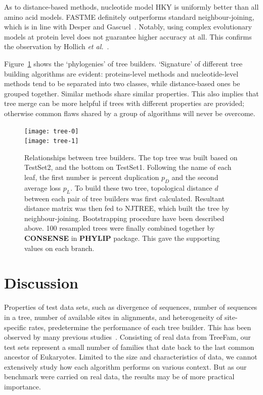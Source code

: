 As to distance-based methods, nucleotide model HKY is uniformly better than all amino acid models.
FASTME definitely outperforms standard neighbour-joining, which is in line with Desper and Gascuel~\cite{desper04}.
Notably, using complex evolutionary models at protein level does not guarantee higher accuracy at all.
This confirms the observation by Hollich {\it et al.}~\cite{hollich05}.

Figure~\ref{fig:phy-tree} shows the `phylogenies' of tree builders. `Signature' of different
tree building algorithms are evident: proteins-level methods and nucleotide-level methods
tend to be separated into two classes, while distance-based ones be grouped together.
Similar methods share similar properties. This also implies that tree merge can be more
helpful if trees with different properties are provided; otherwise common flaws
shared by a group of algorithms will never be overcome.

\begin{figure}[!hb]
\begin{center}
\texttt{[image: tree-0]}\\
\texttt{[image: tree-1]}
\caption[Relationships between tree builders]
{Relationships between tree builders. The top tree was built based on {\sf TestSet2}, and
the bottom on {\sf TestSet1}. Following the name of each leaf, the first number is percent duplication $p_D$
and the second average loss $p_L$. To build these two tree, topological distance $d$ between each pair of tree builders
was first calculated. Resultant distance matrix was then fed to NJTREE, which built the tree
by neighbour-joining. Bootstrapping procedure have been described above. 100 resampled
trees were finally combined together by {\bf CONSENSE} in {\bf PHYLIP} package. This
gave the supporting values on each branch.}\label{fig:phy-tree}
\end{center}
\end{figure}

\section{Discussion}
Properties of test data sets, such as divergence of sequences,
number of sequences in a tree, number of available sites in alignments,
and heterogeneity of site-specific rates, predetermine the performance
of each tree builder. This has been observed by many previous
studies~\cite{kuhner94,hall05,hollich05}. Consisting of real data from TreeFam,
our test sets represent a small number of families that date back to the last common
ancestor of Eukaryotes. Limited to the size and characteristics of data, we cannot
extensively study how each algorithm performs on various context. But as our benchmark
were carried on real data, the results may be of more practical importance.

